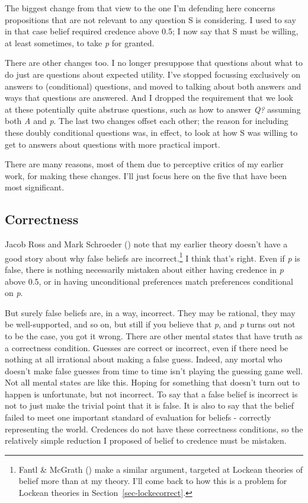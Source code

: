 \documentclass[
  10pt,
  letterpaper,
  twoside]{scrbook}
\begin{document}
The biggest change from that view to the one I'm defending here concerns
propositions that are not relevant to any question S is considering. I
used to say in that case belief required credence above 0.5; I now say
that S must be willing, at least sometimes, to take \emph{p} for
granted.

There are other changes too. I no longer presuppose that questions about
what to do just are questions about expected utility. I've stopped
focussing exclusively on answers to (conditional) questions, and moved
to talking about both answers and ways that questions are answered. And
I dropped the requirement that we look at these potentially quite
abstruse questions, such as how to answer \emph{Q?} assuming both
\emph{A} and \emph{p}. The last two changes offset each other; the
reason for including these doubly conditional questions was, in effect,
to look at how S was willing to get to answers about questions with more
practical import.

There are many reasons, most of them due to perceptive critics of my
earlier work, for making these changes. I'll just focus here on the five
that have been most significant.

\subsection{Correctness}\label{sec-mecorrect}

Jacob Ross and Mark Schroeder ()
note that my earlier theory doesn't have a good story about why false
beliefs are incorrect.\footnote{Fantl \& McGrath
  () make a similar argument,
  targeted at Lockean theories of belief more than at my theory. I'll
  come back to how this is a problem for Lockean theories in
  Section~\ref{sec-lockecorrect}.} I think that's right. Even if
\emph{p} is false, there is nothing necessarily mistaken about either
having credence in \emph{p} above 0.5, or in having unconditional
preferences match preferences conditional on \emph{p}.

But surely false beliefs are, in a way, incorrect. They may be rational,
they may be well-supported, and so on, but still if you believe that
\emph{p}, and \emph{p} turns out not to be the case, you got it wrong.
There are other mental states that have truth as a correctness
condition. Guesses are correct or incorrect, even if there need be
nothing at all irrational about making a false guess. Indeed, any mortal
who doesn't make false guesses from time to time isn't playing the
guessing game well. Not all mental states are like this. Hoping for
something that doesn't turn out to happen is unfortunate, but not
incorrect. To say that a false belief is incorrect is not to just make
the trivial point that it is false. It is also to say that the belief
failed to meet one important standard of evaluation for beliefs -
correctly representing the world. Credences do not have these
correctness conditions, so the relatively simple reduction I proposed of
belief to credence must be mistaken.
\end{document}
